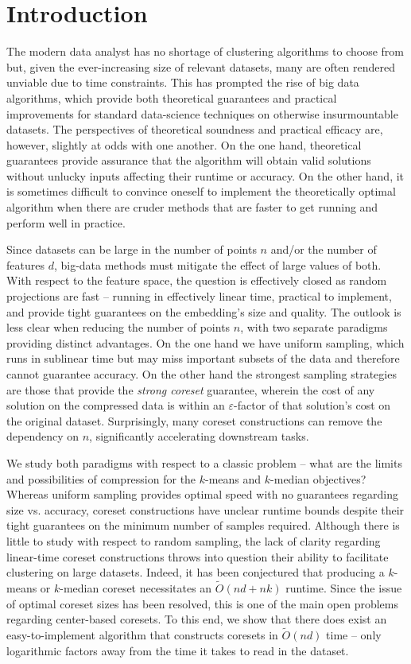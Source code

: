 \section{Introduction}

The modern data analyst has no shortage of clustering algorithms to choose from but, given the ever-increasing size of relevant datasets, many are often
rendered unviable due to time constraints. This has prompted the rise of big data algorithms, which provide both theoretical guarantees and
practical improvements for standard data-science techniques on otherwise insurmountable datasets. The perspectives
of theoretical soundness and practical efficacy are, however, slightly at odds with one another. On the one hand, theoretical guarantees provide assurance that
the algorithm will obtain valid solutions without unlucky inputs affecting their runtime or accuracy. On the other hand, it is sometimes difficult to convince
oneself to implement the theoretically optimal algorithm when there are cruder methods that are faster to get running and perform well in practice.

Since datasets can be large in the number of points $n$ and/or the number of features $d$, big-data methods must mitigate the effect of large values of both.
With respect to the feature space, the question is effectively closed as random projections are fast -- running in effectively linear time, practical to
implement, and provide tight guarantees on the embedding's size and quality. The outlook is less clear when reducing the number of points $n$, with
two separate paradigms providing distinct advantages.  On the one hand we have uniform sampling, which runs in sublinear time but may miss important subsets of
the data and therefore cannot guarantee accuracy.  On the other hand the strongest sampling strategies are those that provide the \emph{strong coreset}
guarantee, wherein the cost of any solution on the compressed data is within an $\varepsilon$-factor of that solution's cost on the original dataset.
Surprisingly, many coreset constructions can remove the dependency on $n$, significantly accelerating downstream tasks.

We study both paradigms with respect to a classic problem -- what are the limits and possibilities of compression for the $k$-means and $k$-median objectives?
Whereas uniform sampling provides optimal speed with no guarantees regarding size vs. accuracy, coreset constructions have
unclear runtime bounds despite their tight guarantees on the minimum number of samples required. Although there is little to study with respect to random
sampling, the lack of clarity regarding linear-time coreset constructions throws into question their ability to facilitate clustering on large datasets.
Indeed, it has been conjectured that producing a $k$-means or $k$-median coreset necessitates an $\tilde{O}(nd + nk)$ runtime.
Since the issue of optimal coreset sizes has been resolved, this is one of the main open problems regarding center-based coresets. To this end, we show that
there does exist an easy-to-implement algorithm that constructs coresets in $\tilde{O}(nd)$ time -- only logarithmic factors away from the time it takes to read
in the dataset.

